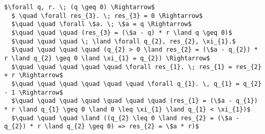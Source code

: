 \begin{lstlisting}[mathescape=true]
  $\forall q, r. \; (q \geq 0) \Rightarrow$
  $ \quad \forall res_{3}. \; res_{3} = 0 \Rightarrow$
  $\quad \quad \forall \$a. \; \$a = q \Rightarrow$
  $\quad \quad \quad (res_{3} = (\$a - q) * r \land q \geq 0)$
  $\quad \quad \quad \; \land \forall q_{2}, res_{2}, \xi_{1}.$
  $\quad \quad \quad \quad (q_{2} > 0 \land res_{2} = (\$a - q_{2}) * r \land q_{2} \geq 0 \land \xi_{1} = q_{2}) \Rightarrow$
  $\quad \quad \quad \quad \quad \forall res_{1}. \; res_{1} = res_{2} + r \Rightarrow$
  $\quad \quad \quad \quad \quad \quad \forall q_{1}. \, q_{1} = q_{2} - 1 \Rightarrow$
  $\quad \quad \quad \quad \quad \quad \quad (res_{1} = (\$a - q_{1}) * r \land q_{1} \geq 0 \land 0 \leq \xi_{1} \land q_{1} < \xi_{1})$
  $\quad \quad \quad \land ((q_{2} \leq 0 \land res_{2} = (\$a - q_{2}) * r \land q_{2} \geq 0) => res_{2} = \$a * r)$
  \end{lstlisting}
